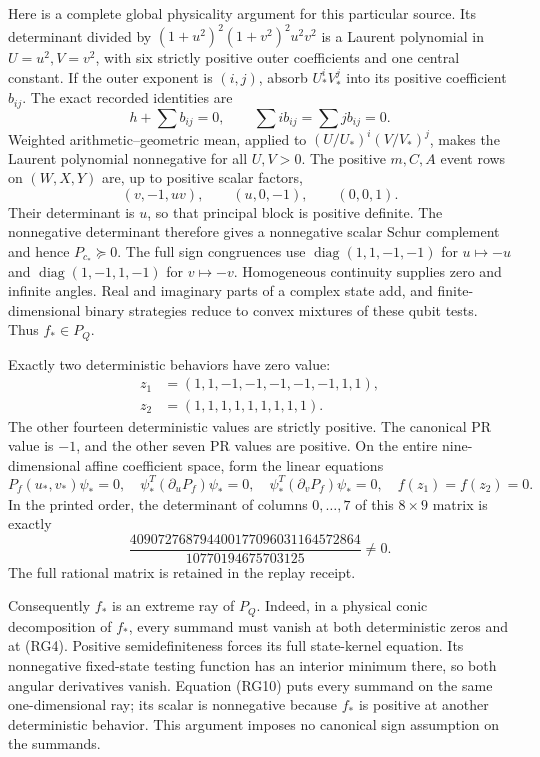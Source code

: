 Here is a complete global physicality argument for this particular
source.  Its determinant divided by $(1+u^2)^2(1+v^2)^2u^2v^2$ is
a Laurent polynomial in $U=u^2,V=v^2$, with six strictly positive
outer coefficients and one central constant.  If the outer exponent
is $(i,j)$, absorb $U_*^iV_*^j$ into its positive coefficient $b_{ij}$.
The exact recorded identities are
\[
 h+\sum b_{ij}=0,\qquad
 \sum i b_{ij}=\sum j b_{ij}=0.                                   \tag{RG7}
\]
Weighted arithmetic--geometric mean, applied to
$(U/U_*)^i(V/V_*)^j$, makes the Laurent polynomial nonnegative for
all $U,V>0$.  The positive $m,C,A$ event rows on $(W,X,Y)$ are,
up to positive scalar factors,
\[
 (v,-1,uv),\qquad(u,0,-1),\qquad(0,0,1).
\]
Their determinant is $u$, so that principal block is positive definite.
The nonnegative determinant therefore gives a nonnegative scalar Schur
complement and hence $P_{c_*}\succeq0$.  The full sign congruences use
$\operatorname{diag}(1,1,-1,-1)$ for $u\mapsto-u$ and
$\operatorname{diag}(1,-1,1,-1)$ for $v\mapsto-v$.  Homogeneous
continuity supplies zero and infinite angles.  Real and imaginary
parts of a complex state add, and finite-dimensional binary strategies
reduce to convex mixtures of these qubit tests.  Thus $f_*\in P_Q$.

Exactly two deterministic behaviors have zero value:
\[
\begin{aligned}
 z_1&=(1,1,-1,-1,-1,-1,-1,1,1),\\
 z_2&=(1,1,1,1,1,1,1,1,1).
\end{aligned}                                                       \tag{RG8}
\]
The other fourteen deterministic values are strictly positive.  The
canonical PR value is $-1$, and the other seven PR values are positive.
On the entire nine-dimensional affine coefficient space, form the
linear equations
\[
 P_f(u_*,v_*)\psi_*=0,\quad
 \psi_*^T(\partial_uP_f)\psi_*=0,\quad
 \psi_*^T(\partial_vP_f)\psi_*=0,\quad
 f(z_1)=f(z_2)=0.                                                   \tag{RG9}
\]
In the printed order, the determinant of columns $0,\ldots,7$ of
this $8\times9$ matrix is exactly
\[
 \frac{409072768794400177096031164572864}{10770194675703125}\ne0.     \tag{RG10}
\]
The full rational matrix is retained in the replay receipt.

Consequently $f_*$ is an extreme ray of $P_Q$.  Indeed, in a physical
conic decomposition of $f_*$, every summand must vanish at both
deterministic zeros and at (RG4).  Positive semidefiniteness forces
its full state-kernel equation.  Its nonnegative fixed-state testing
function has an interior minimum there, so both angular derivatives
vanish.  Equation (RG10) puts every summand on the same one-dimensional
ray; its scalar is nonnegative because $f_*$ is positive at another
deterministic behavior.  This argument imposes no canonical sign
assumption on the summands.

